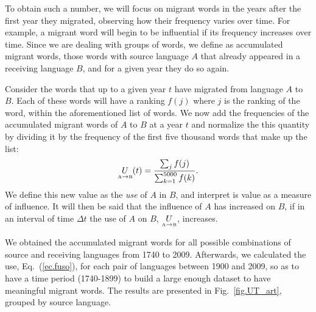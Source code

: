 \documentclass[10pt,letterpaper]{article} %
\newcommand{\eref}[1]{Eq.~(\ref{#1})}
\newcommand{\fref}[1]{Fig.~\ref{#1}}
\begin{document}
To obtain such a number, we will focus on migrant words in the years after the
first year they migrated, observing how their frequency varies over time. For
example, a migrant word will begin to be influential if its frequency increases
over time. Since we are dealing with groups of words, we define as accumulated
migrant words, those words with source language $A$ that already appeared in a
receiving language $B$, and for a given year they do so again.


Consider the words that up to a given year $t$ have migrated from language $A$ to $B$. Each of these
words will have a ranking $f(j)$ where $j$ is the ranking of the word, within the aforementioned
list of words. 
% 
We now
add the frequencies of the accumulated
migrant words of $A$ to $B$ at a year $t$ and normalize the this quantity by
dividing it by the frequency of the first five thousand words that make up the list:
\begin{equation}
\label{ec.fuso}
\underset{ \text{\tiny A} \to  \text{\tiny B} }{U}(t) = \frac{\sum_{j}
f(j)}{\sum_{k=1}^{5000} f(k)}.
\end{equation}
We define this new value as the \textit{use} of $A$ in $B$, and interpret is value
as a measure of influence. It will then be said that the influence of $A$ has increased on
$B$, if in an interval of time $\Delta t$ the use of $A$ on $B$, $\underset{ \text{\tiny A} \to  \text{\tiny B} }{U}$, increases.

We obtained the accumulated migrant words for all possible combinations of
source and receiving languages from 1740 to 2009.  Afterwards, we calculated
the use, \eref{ec.fuso},  for each pair of languages between 1900 and 2009, so
as to have a time period (1740-1899) to build a large enough dataset to have
meaningful migrant words. The results are presented in \fref{fig.UT_art}, 
grouped by source language. 


% 
\end{document}
